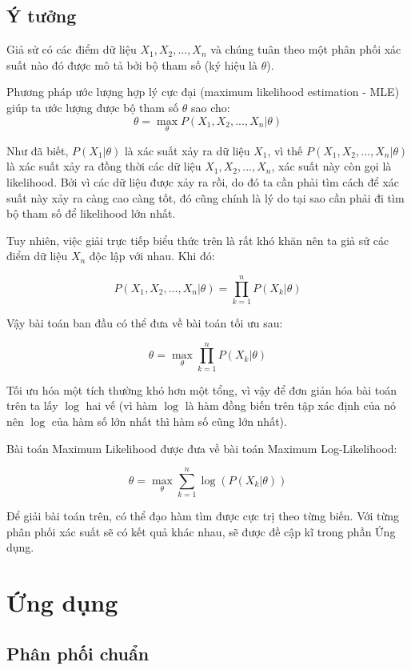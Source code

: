 \documentclass[12pt]{article}
\begin{document}
\subsection{Ý tưởng}
{\fontsize{13}{16}\selectfont
\setlength{\parskip}{0.3cm}
Giả sử có các điểm dữ liệu $X_1, X_2,...,X_n$ và chúng tuân theo một phân phối xác suất nào đó được mô tả bởi bộ tham số (ký hiệu là $\theta$). 

\noindent Phương pháp ước lượng hợp lý cực đại (maximum likelihood estimation - MLE) giúp ta ước lượng được bộ tham số $\theta$ sao cho: 
$$\theta = \max_{\theta} P(X_1, X_2,...,X_n | \theta)$$

\noindent Như đã biết, $P(X_1 | \theta)$ là xác suất xảy ra dữ liệu $X_1$, vì thế $P(X_1, X_2,...,X_n | \theta)$ là xác suất xảy ra đồng thời các dữ liệu $X_1, X_2,...,X_n$, xác suất này còn gọi là likelihood. Bởi vì các dữ liệu được xảy ra rồi, do đó ta cần phải tìm cách để xác suất này xảy ra càng cao càng tốt, đó cũng chính là lý do tại sao cần phải đi tìm bộ tham số để likelihood lớn nhất.

\noindent Tuy nhiên, việc giải trực tiếp biểu thức trên là rất khó khăn nên ta giả sử các điểm dữ liệu $X_n$ độc lập với nhau. Khi đó:

$$P(X_1, X_2,...,X_n | \theta) = \prod_{k = 1}^{n}P(X_k|\theta)$$

\noindent Vậy bài toán ban đầu có thể đưa về bài toán tối ưu sau:

$$\theta = \max_{\theta}\prod_{k = 1}^{n}P(X_k|\theta)$$

\noindent Tối ưu hóa một tích thường khó hơn một tổng, vì vậy để đơn giản hóa bài toán trên ta lấy $\log$ hai vế (vì hàm $\log$ là hàm đồng biến trên tập xác định của nó nên $\log$ của hàm số lớn nhất thì hàm số cũng lớn nhất).

\noindent Bài toán Maximum Likelihood được đưa về bài toán Maximum Log-Likelihood:

$$\theta = \max_{\theta}\sum_{k = 1}^{n}\log(P(X_k|\theta))$$

\noindent Để giải bài toán trên, có thể đạo hàm tìm được cực trị theo từng biến. Với từng phân phối xác suất sẽ có kết quả khác nhau, sẽ được đề cập kĩ trong phần Ứng dụng.

\section{Ứng dụng}
\subsection{Phân phối chuẩn}
}
\end{document}
